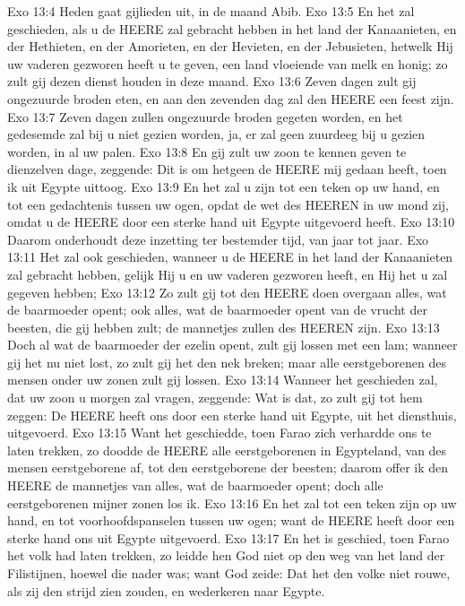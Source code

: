 Exo 13:4  Heden gaat gijlieden uit, in de maand Abib.
Exo 13:5  En het zal geschieden, als u de HEERE zal gebracht hebben in het land der Kanaanieten, en der Hethieten, en der Amorieten, en der Hevieten, en der Jebusieten, hetwelk Hij uw vaderen gezworen heeft u te geven, een land vloeiende van melk en honig; zo zult gij dezen dienst houden in deze maand.
Exo 13:6  Zeven dagen zult gij ongezuurde broden eten, en aan den zevenden dag zal den HEERE een feest zijn.
Exo 13:7  Zeven dagen zullen ongezuurde broden gegeten worden, en het gedesemde zal bij u niet gezien worden, ja, er zal geen zuurdeeg bij u gezien worden, in al uw palen.
Exo 13:8  En gij zult uw zoon te kennen geven te dienzelven dage, zeggende: Dit is om hetgeen de HEERE mij gedaan heeft, toen ik uit Egypte uittoog.
Exo 13:9  En het zal u zijn tot een teken op uw hand, en tot een gedachtenis tussen uw ogen, opdat de wet des HEEREN in uw mond zij, omdat u de HEERE door een sterke hand uit Egypte uitgevoerd heeft.
Exo 13:10  Daarom onderhoudt deze inzetting ter bestemder tijd, van jaar tot jaar.
Exo 13:11  Het zal ook geschieden, wanneer u de HEERE in het land der Kanaanieten zal gebracht hebben, gelijk Hij u en uw vaderen gezworen heeft, en Hij het u zal gegeven hebben;
Exo 13:12  Zo zult gij tot den HEERE doen overgaan alles, wat de baarmoeder opent; ook alles, wat de baarmoeder opent van de vrucht der beesten, die gij hebben zult; de mannetjes zullen des HEEREN zijn.
Exo 13:13  Doch al wat de baarmoeder der ezelin opent, zult gij lossen met een lam; wanneer gij het nu niet lost, zo zult gij het den nek breken; maar alle eerstgeborenen des mensen onder uw zonen zult gij lossen.
Exo 13:14  Wanneer het geschieden zal, dat uw zoon u morgen zal vragen, zeggende: Wat is dat, zo zult gij tot hem zeggen: De HEERE heeft ons door een sterke hand uit Egypte, uit het diensthuis, uitgevoerd.
Exo 13:15  Want het geschiedde, toen Farao zich verhardde ons te laten trekken, zo doodde de HEERE alle eerstgeborenen in Egypteland, van des mensen eerstgeborene af, tot den eerstgeborene der beesten; daarom offer ik den HEERE de mannetjes van alles, wat de baarmoeder opent; doch alle eerstgeborenen mijner zonen los ik.
Exo 13:16  En het zal tot een teken zijn op uw hand, en tot voorhoofdspanselen tussen uw ogen; want de HEERE heeft door een sterke hand ons uit Egypte uitgevoerd.
Exo 13:17  En het is geschied, toen Farao het volk had laten trekken, zo leidde hen God niet op den weg van het land der Filistijnen, hoewel die nader was; want God zeide: Dat het den volke niet rouwe, als zij den strijd zien zouden, en wederkeren naar Egypte.
